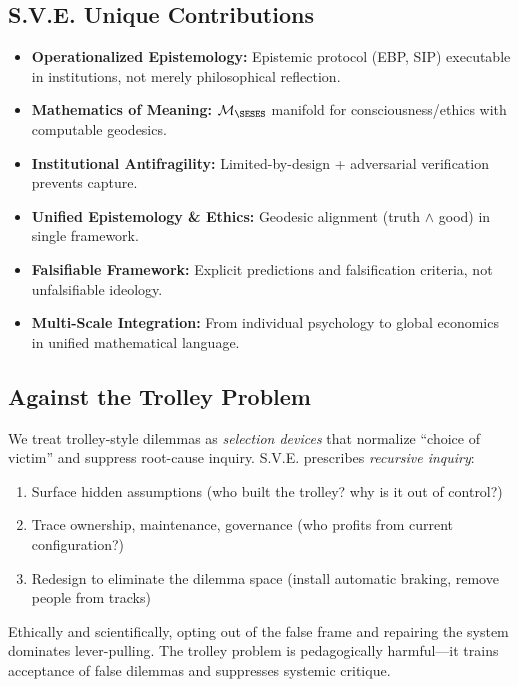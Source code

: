 \documentclass[11pt,a4paper]{article}
\theoremstyle{definition}
\theoremstyle{remark}
\begin{document}
\subsection{S.V.E. Unique Contributions}
\label{subsec:sve_unique}

\begin{itemize}[leftmargin=*]
\item \textbf{Operationalized Epistemology:} Epistemic protocol (EBP, SIP) executable in institutions, not merely philosophical reflection.
\item \textbf{Mathematics of Meaning:} $\mathcal{M}_{\SESES}$ manifold for consciousness/ethics with computable geodesics.
\item \textbf{Institutional Antifragility:} Limited-by-design + adversarial verification prevents capture.
\item \textbf{Unified Epistemology \& Ethics:} Geodesic alignment (truth $\land$ good) in single framework.
\item \textbf{Falsifiable Framework:} Explicit predictions and falsification criteria, not unfalsifiable ideology.
\item \textbf{Multi-Scale Integration:} From individual psychology to global economics in unified mathematical language.
\end{itemize}

\subsection{Against the Trolley Problem}
\label{subsec:trolley}

We treat trolley-style dilemmas as \emph{selection devices} that normalize ``choice of victim'' and suppress root-cause inquiry. S.V.E. prescribes \emph{recursive inquiry}:
\begin{enumerate}
    \item Surface hidden assumptions (who built the trolley? why is it out of control?)
    \item Trace ownership, maintenance, governance (who profits from current configuration?)
    \item Redesign to eliminate the dilemma space (install automatic braking, remove people from tracks)
\end{enumerate}

Ethically and scientifically, opting out of the false frame and repairing the system dominates lever-pulling. The trolley problem is pedagogically harmful---it trains acceptance of false dilemmas and suppresses systemic critique.
\end{document}
